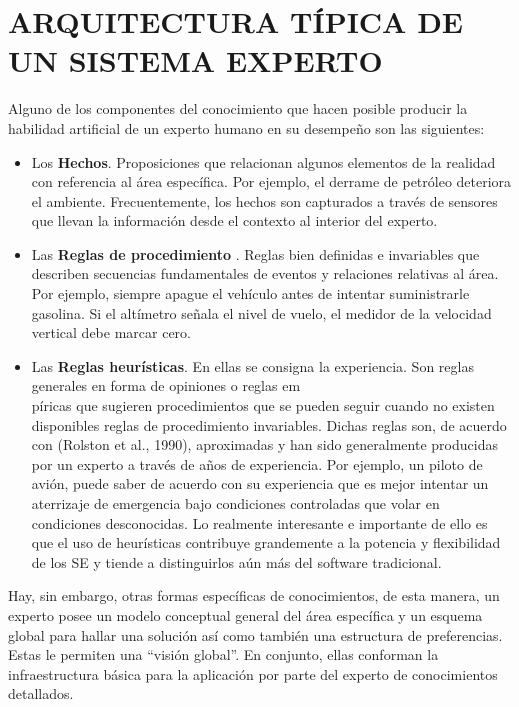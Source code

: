 \section{ARQUITECTURA TÍPICA  DE UN SISTEMA EXPERTO}
Alguno de los componentes del conocimiento que hacen posible producir la habilidad artificial de un  experto humano en su desempeño son las siguientes: 
\begin{itemize}
    \item 	Los \textbf{Hechos}. Proposiciones que relacionan algunos elementos de la realidad con referencia al área específica. Por ejemplo, el derrame de petróleo deteriora el ambiente.  Frecuentemente, los hechos son capturados a través de sensores que llevan la información desde el contexto al interior del experto. 
    \item 	Las \textbf{Reglas de procedimiento} . Reglas bien definidas e invariables que describen secuencias fundamentales de eventos y relaciones relativas al área. Por ejemplo, siempre apague el vehículo antes de intentar suministrarle gasolina. Si el altímetro señala el nivel de vuelo, el medidor de la velocidad vertical debe marcar cero.
    \item 	Las \textbf{Reglas heurísticas}. En ellas se consigna la experiencia. Son reglas generales en forma de opiniones o reglas em\\píricas que sugieren procedimientos que se pueden seguir cuando no existen disponibles reglas de procedimiento invariables. Dichas reglas son, de acuerdo con (Rolston et al., 1990),  aproximadas y han sido generalmente producidas por un experto a través de años de experiencia. Por ejemplo, un piloto de avión, puede saber de acuerdo con su experiencia que es mejor intentar un aterrizaje de emergencia bajo condiciones controladas que volar en condiciones desconocidas.  Lo realmente interesante e importante de ello es que el uso de heurísticas contribuye grandemente a la potencia y flexibilidad de los SE y tiende a distinguirlos aún más del software tradicional.
\end{itemize}
Hay, sin embargo, otras formas específicas de conocimientos, de esta manera, un experto posee un modelo conceptual general del área específica y un esquema global para hallar una solución así como también una estructura de preferencias. Estas le permiten una “visión global”.  En conjunto, ellas conforman la infraestructura básica para la aplicación por parte del experto de conocimientos detallados.   \\
